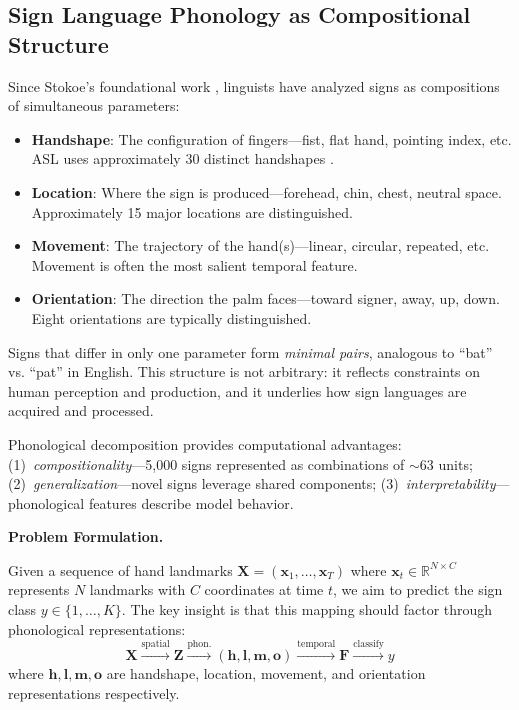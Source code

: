 \documentclass{article}
\theoremstyle{definition}
\theoremstyle{remark}
\begin{document}
\subsection{Sign Language Phonology as Compositional Structure}

Since Stokoe's foundational work \citep{stokoe1960sign}, linguists have analyzed signs as compositions of simultaneous parameters:
\begin{itemize}[nosep,topsep=2pt]
\item \textbf{Handshape}: The configuration of fingers---fist, flat hand, pointing index, etc. ASL uses approximately 30 distinct handshapes \citep{battison1978lexical}.
\item \textbf{Location}: Where the sign is produced---forehead, chin, chest, neutral space. Approximately 15 major locations are distinguished.
\item \textbf{Movement}: The trajectory of the hand(s)---linear, circular, repeated, etc. Movement is often the most salient temporal feature.
\item \textbf{Orientation}: The direction the palm faces---toward signer, away, up, down. Eight orientations are typically distinguished.
\end{itemize}

Signs that differ in only one parameter form \textit{minimal pairs}, analogous to ``bat'' vs. ``pat'' in English. This structure is not arbitrary: it reflects constraints on human perception and production, and it underlies how sign languages are acquired and processed.

Phonological decomposition provides computational advantages: (1)~\textit{compositionality}---5,000 signs represented as combinations of $\sim$63 units; (2)~\textit{generalization}---novel signs leverage shared components; (3)~\textit{interpretability}---phonological features describe model behavior.

\textbf{Problem Formulation.}

Given a sequence of hand landmarks $\mathbf{X} = (\mathbf{x}_1, \ldots, \mathbf{x}_T)$ where $\mathbf{x}_t \in \mathbb{R}^{N \times C}$ represents $N$ landmarks with $C$ coordinates at time $t$, we aim to predict the sign class $y \in \{1, \ldots, K\}$. The key insight is that this mapping should factor through phonological representations:
\begin{equation}
\mathbf{X} \xrightarrow{\text{spatial}} \mathbf{Z} \xrightarrow{\text{phon.}} (\mathbf{h}, \mathbf{l}, \mathbf{m}, \mathbf{o}) \xrightarrow{\text{temporal}} \mathbf{F} \xrightarrow{\text{classify}} y
\end{equation}
where $\mathbf{h}, \mathbf{l}, \mathbf{m}, \mathbf{o}$ are handshape, location, movement, and orientation representations respectively.
\end{document}
